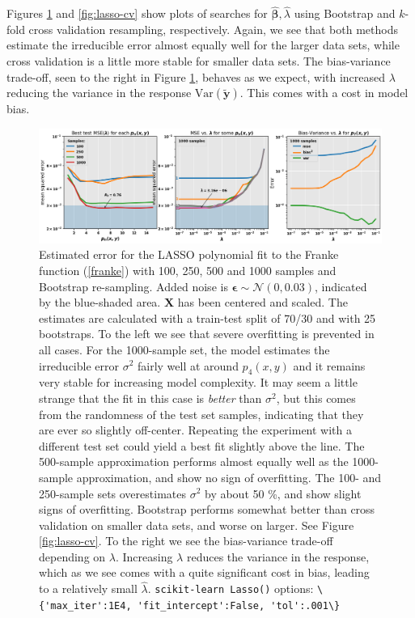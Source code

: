 \documentclass[]{article}
\begin{document}
Figures \ref{fig:lasso-bootstrap} and \ref{fig:lasso-cv} show plots of searches for $\mathbf{\hat{\beta}}, \hat{\lambda}$ using Bootstrap and $k$-fold cross validation resampling, respectively. Again, we see that both methods estimate the irreducible error almost equally well for the larger data sets, while cross validation is a little more stable for smaller data sets. The bias-variance trade-off, seen to the right in Figure \ref{fig:lasso-bootstrap}, behaves as we expect, with increased $\lambda$ reducing the variance in the response $\mathrm{Var}(\mathbf{\tilde{y}})$. This comes with a cost in model bias.

\begin{figure}[!htb]
	\centering
	\includegraphics[width=1\linewidth]{./results/lasso-bootstrap.png}
	\caption{Estimated error for the LASSO polynomial fit to the Franke function (\ref{franke}) with 100, 250, 500 and 1000 samples and Bootstrap re-sampling. Added noise is $\mathbf{\epsilon} \sim \mathcal{N}(0, 0.03)$, indicated by the blue-shaded area. $\mathbf{X}$ has been centered and scaled. The estimates are calculated with a train-test split of 70/30 and with 25 bootstraps. To the left we see that severe overfitting is prevented in all cases. For the 1000-sample set, the model estimates the irreducible error $\sigma^2$ fairly well at around $p_4(x,y)$ and it remains very stable for increasing model complexity. It may seem a little strange that the fit in this case is \textit{better} than $\sigma^2$, but this comes from the randomness of the test set samples, indicating that they are ever so slightly off-center. Repeating the experiment with a different test set could yield a best fit slightly above the line. The 500-sample approximation performs almost equally well as the 1000-sample approximation, and show no sign of overfitting. The 100- and 250-sample sets overestimates $\sigma^2$ by about 50 \%, and show slight signs of overfitting. Bootstrap performs somewhat better than cross validation on smaller data sets, and worse on larger. See Figure \ref{fig:lasso-cv}. To the right we see the bias-variance trade-off depending on $\lambda$. Increasing $\lambda$ reduces the variance in the response, which as we see comes with a quite significant cost in bias, leading to a relatively small $\hat{\lambda}$. \lstinline|scikit-learn Lasso()| options: \lstinline|\{'max_iter':1E4, 'fit_intercept':False, 'tol':.001\}|}
	\label{fig:lasso-bootstrap}
\end{figure}
\end{document}
